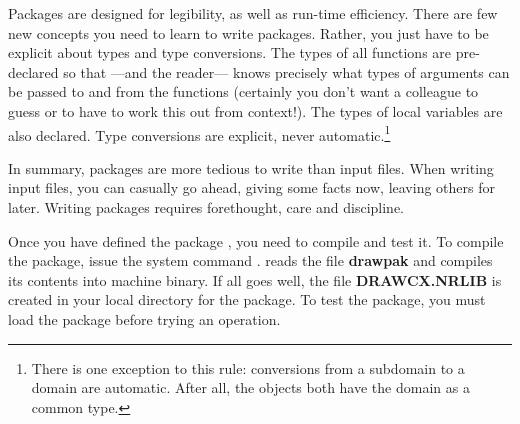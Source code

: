 Packages are designed for legibility, as well as
run-time efficiency.
There are few new concepts you need to learn to write
packages. Rather, you just have to be explicit about types
and type conversions.
The types of all functions are pre-declared so that \Language{}---and the reader---
knows precisely what types of arguments can be passed to and from
the functions (certainly you don't want a colleague to guess or to
have to work this out from context!).
The types of local variables are also declared.
Type conversions are explicit, never automatic.\footnote{There
is one exception to this rule: conversions from a subdomain to a
domain are automatic.
After all, the objects both have the domain as a common type.}

In summary, packages are more tedious to write than input files.
When writing input files, you can casually go ahead, giving some
facts now, leaving others for later.
Writing packages requires forethought, care and discipline.

%

Once you have defined the package ,
you need to compile and test it.
To compile the package, issue the system command .
\Language{} reads the file {\bf drawpak\spadFileExt{}}
and compiles its contents into machine binary.
If all goes well, the file {\bf DRAWCX.NRLIB} is created in your
local directory for the package.
To test the package, you must load the package before trying an
operation.

